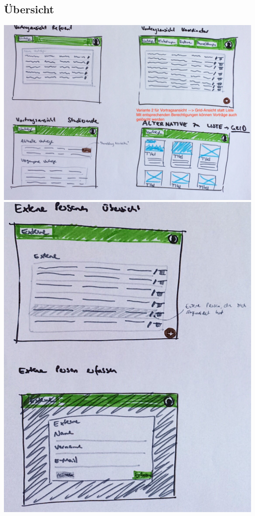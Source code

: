 \documentclass[11pt]{article} %
\begin{document}
\subsection{Übersicht}
\includegraphics[width=1\textwidth]{prototyp/Vortragansicht}
\includegraphics[width=1\textwidth]{prototyp/ExternePersonen}
\end{document}
